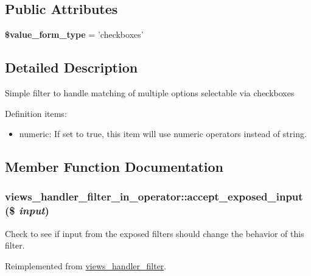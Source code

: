 \subsection*{Public Attributes}
\begin{CompactItemize}
\item 
\hypertarget{classviews__handler__filter__in__operator_8541978637934d90d452a0cdfedca1ce}{
\textbf{\$value\_\-form\_\-type} = 'checkboxes'}
\label{classviews__handler__filter__in__operator_8541978637934d90d452a0cdfedca1ce}

\end{CompactItemize}


\subsection{Detailed Description}
Simple filter to handle matching of multiple options selectable via checkboxes

Definition items:\begin{itemize}
\item numeric: If set to true, this item will use numeric operators instead of string. \end{itemize}


\subsection{Member Function Documentation}
\hypertarget{classviews__handler__filter__in__operator_ff2b25941729b9ca81e1e53bb8e95a96}{
\subsubsection[{accept\_\-exposed\_\-input}]{\setlength{\rightskip}{0pt plus 5cm}views\_\-handler\_\-filter\_\-in\_\-operator::accept\_\-exposed\_\-input (\$ {\em input})}}
\label{classviews__handler__filter__in__operator_ff2b25941729b9ca81e1e53bb8e95a96}


Check to see if input from the exposed filters should change the behavior of this filter. 

Reimplemented from \hyperlink{classviews__handler__filter_88ccd2ef359009614abb48fb83c2a738}{views\_\-handler\_\-filter}.

